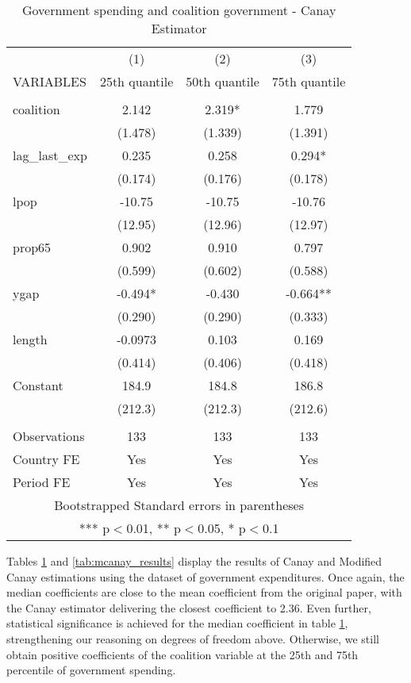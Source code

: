 \documentclass{article}
\begin{document}
\begin{table}
    \centering
    \caption{Government spending and coalition government - Canay Estimator}
    \begin{tabular}{lccc}
    &   &   & \\ \hline
     & (1) & (2) & (3) \\
    VARIABLES & 25th quantile & 50th quantile & 75th quantile \\ \hline
     &  &  &  \\
    coalition & 2.142 & 2.319* & 1.779 \\
     & (1.478) & (1.339) & (1.391) \\
    lag\_last\_exp & 0.235 & 0.258 & 0.294* \\
     & (0.174) & (0.176) & (0.178) \\
    lpop & -10.75 & -10.75 & -10.76 \\
     & (12.95) & (12.96) & (12.97) \\
    prop65 & 0.902 & 0.910 & 0.797 \\
     & (0.599) & (0.602) & (0.588) \\
    ygap & -0.494* & -0.430 & -0.664** \\
     & (0.290) & (0.290) & (0.333) \\
    length & -0.0973 & 0.103 & 0.169 \\
     & (0.414) & (0.406) & (0.418) \\
    Constant & 184.9 & 184.8 & 186.8 \\
     & (212.3) & (212.3) & (212.6) \\
     &  &  &  \\
    Observations & 133 & 133 & 133 \\
    Country FE & Yes & Yes & Yes \\
     Period FE & Yes & Yes & Yes \\ \hline
    \multicolumn{4}{c}{ Bootstrapped Standard errors in parentheses} \\
    \multicolumn{4}{c}{ *** p$<$0.01, ** p$<$0.05, * p$<$0.1} \\
    \end{tabular}
    \label{tab:canay_results}
\end{table}

Tables \ref{tab:canay_results} and \ref{tab:mcanay_results} display the results of Canay and Modified Canay estimations using the \cite{persson2007} dataset of government expenditures. Once again, the median coefficients are close to the mean coefficient from the original paper, with the Canay estimator delivering the closest coefficient to 2.36. Even further, statistical significance is achieved for the median coefficient in table \ref{tab:canay_results}, strengthening our reasoning on degrees of freedom above. Otherwise, we still obtain positive coefficients of the coalition variable at the 25th and 75th percentile of government spending. 
\end{document}
